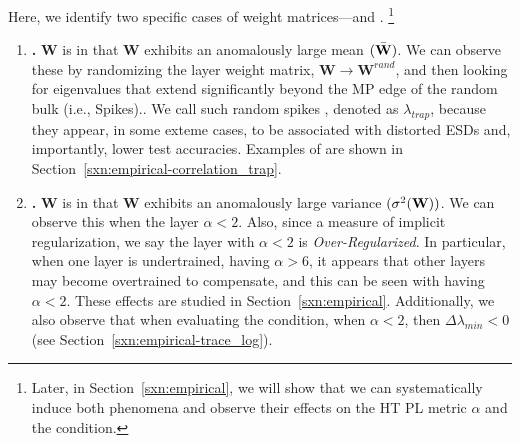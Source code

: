 Here, we identify two specific cases of \ATypical weight matrices---\CorrelationTraps and \emph{\OverRegularization}.%
\footnote{Later, in Section~\ref{sxn:empirical}, we will show that we can systematically induce both phenomena and observe their effects on the \HTSR HT PL metric $\alpha$ and the \SETOL \TRACELOG condition.}
\begin{enumerate}[label=3.3.\arabic*]
  \item 
  \textbf{\CorrelationTraps.} 
  $\mathbf{W}$ is \ATypical in that $\mathbf{W}$
 exhibits an anomalously large mean $(\bar{{\mathbf{W}}})$.  
  We can observe these by randomizing the layer weight matrix, $\mathbf{W}\rightarrow\mathbf{W}^{rand}$, and then looking
  for eigenvalues that extend significantly beyond the MP edge of the random bulk (i.e., Spikes)..  We call such random spikes
  \emph{\CorrelationTraps},  denoted as $\lambda_{trap}$, because they appear, in some exteme cases, to be associated with distorted ESDs
  and, importantly, lower test accuracies.  Examples of \CorrelationTraps are shown in Section~\ref{sxn:empirical-correlation_trap}.
  \item 
  \textbf{\OverRegularization.} 
  $\mathbf{W}$ is \ATypical in that $\mathbf{W}$ exhibits an anomalously large variance $(\sigma^2({\mathbf{W}}))$. 
  We can observe this when the layer  $\alpha < 2$.  Also, since \ALPHA a measure of implicit regularization, we say the layer with $\alpha<2$ is \emph{Over-Regularized}.
  In particular, when one layer is undertrained, having $\alpha>6$, it appears that other layers may become overtrained to compensate, and this can be seen with having $\alpha < 2$.
  These effects are studied in Section~\ref{sxn:empirical}.
  Additionally, we also observe that when evaluating the \SETOL \TRACELOG condition, when $\alpha < 2$, then $\Delta \lambda_{min}< 0$ (see Section~\ref{sxn:empirical-trace_log}).

\end{enumerate}









